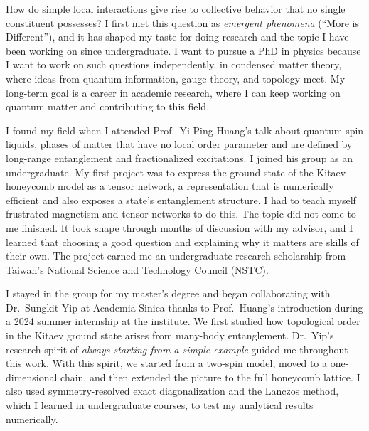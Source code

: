 How do simple local interactions give rise to collective behavior that no single constituent possesses? I first met this question as \textit{emergent phenomena} (``More is Different''), and it has shaped my taste for doing research and the topic I have been working on since undergraduate. I want to pursue a PhD in physics because I want to work on such questions independently, in condensed matter theory, where ideas from quantum information, gauge theory, and topology meet. My long-term goal is a career in academic research, where I can keep working on quantum matter and contributing to this field.

I found my field when I attended Prof.~Yi-Ping Huang's talk about quantum spin liquids, phases of matter that have no local order parameter and are defined by long-range entanglement and fractionalized excitations. I joined his group as an undergraduate. My first project was to express the ground state of the Kitaev honeycomb model as a tensor network, a representation that is numerically efficient and also exposes a state's entanglement structure. I had to teach myself frustrated magnetism and tensor networks to do this. The topic did not come to me finished. It took shape through months of discussion with my advisor, and I learned that choosing a good question and explaining why it matters are skills of their own. The project earned me an undergraduate research scholarship from Taiwan's National Science and Technology Council (NSTC).

I stayed in the group for my master's degree and began collaborating with Dr.~Sungkit Yip at Academia Sinica thanks to Prof.~Huang's introduction during a 2024 summer internship at the institute. We first studied how topological order in the Kitaev ground state arises from many-body entanglement. Dr.~Yip's research spirit of \textit{always starting from a simple example} guided me throughout this work. With this spirit, we started from a two-spin model, moved to a one-dimensional chain, and then extended the picture to the full honeycomb lattice. I also used symmetry-resolved exact diagonalization and the Lanczos method, which I learned in undergraduate courses, to test my analytical results numerically.


